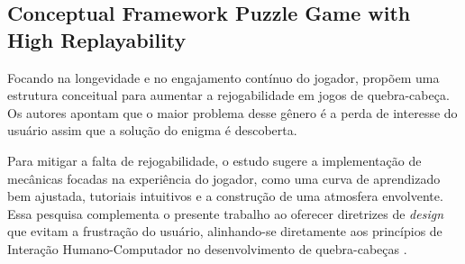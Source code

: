 \subsection{Conceptual Framework Puzzle Game with High Replayability}

Focando na longevidade e no engajamento contínuo do jogador,  propõem uma estrutura conceitual para aumentar a rejogabilidade em jogos de quebra-cabeça. Os autores apontam que o maior problema desse gênero é a perda de interesse do usuário assim que a solução do enigma é descoberta.

Para mitigar a falta de rejogabilidade, o estudo sugere a implementação de mecânicas focadas na experiência do jogador, como uma curva de aprendizado bem ajustada, tutoriais intuitivos e a construção de uma atmosfera envolvente. Essa pesquisa complementa o presente trabalho ao oferecer diretrizes de \textit{design} que evitam a frustração do usuário, alinhando-se diretamente aos princípios de Interação Humano-Computador no desenvolvimento de quebra-cabeças \cite{Adellin2019}.